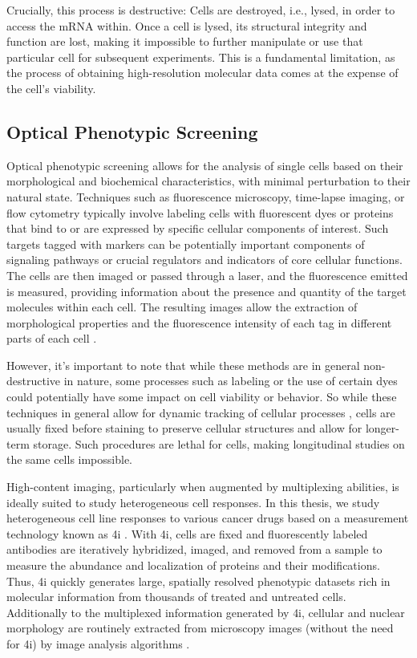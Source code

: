 Crucially, this process is destructive: Cells are destroyed, i.e., lysed, in order to access the \acrshort{mRNA} within.
Once a cell is lysed, its structural integrity and function are lost, making it impossible to further manipulate or use that particular cell for subsequent experiments.
This is a fundamental limitation, as the process of obtaining high-resolution molecular data comes at the expense of the cell's viability.

\subsection{Optical Phenotypic Screening}
\label{sec:background_imaging}

Optical phenotypic screening allows for the analysis of single cells based on their morphological and biochemical characteristics, with minimal perturbation to their natural state. 
Techniques such as fluorescence microscopy, time-lapse imaging, or flow cytometry typically involve labeling cells with fluorescent dyes or proteins that bind to or are expressed by specific cellular components of interest.
Such targets tagged with markers can be potentially important components of signaling pathways or crucial regulators and indicators of core cellular functions. 
The cells are then imaged or passed through a laser, and the fluorescence emitted is measured, providing information about the presence and quantity of the target molecules within each cell. 
The resulting images allow the extraction of morphological properties and the fluorescence intensity of each tag in different parts of each cell \citep{carpenter2006cellprofiler}.

However, it's important to note that while these methods are in general non-destructive in nature, some processes such as labeling or the use of certain dyes could potentially have some impact on cell viability or behavior. So while these techniques in general allow for dynamic tracking of cellular processes \citep{fischer2019inferring, hashimoto2016learning, tvarusko1999time, busch2015fundamental}, cells are usually fixed before staining to preserve cellular structures and allow for longer-term storage. Such procedures are lethal for cells, making longitudinal studies on the same cells impossible.

High-content imaging, particularly when augmented by multiplexing abilities, is ideally suited to study heterogeneous cell responses.
In this thesis, we study heterogeneous cell line responses to various cancer drugs based on a measurement technology known as \acrfull{4i} \citep{gut2018multiplexed}.
With \acrshort{4i}, cells are fixed and fluorescently labeled antibodies are iteratively hybridized, imaged, and removed from a sample to measure the abundance and localization of proteins and their modifications. 
Thus, \acrshort{4i} quickly generates large, spatially resolved phenotypic datasets rich in molecular information from thousands of treated and untreated cells. Additionally to the multiplexed information generated by \acrshort{4i}, cellular and nuclear morphology are routinely extracted from microscopy images (without the need for \acrshort{4i}) by image analysis algorithms \citep{carpenter2006cellprofiler}.

